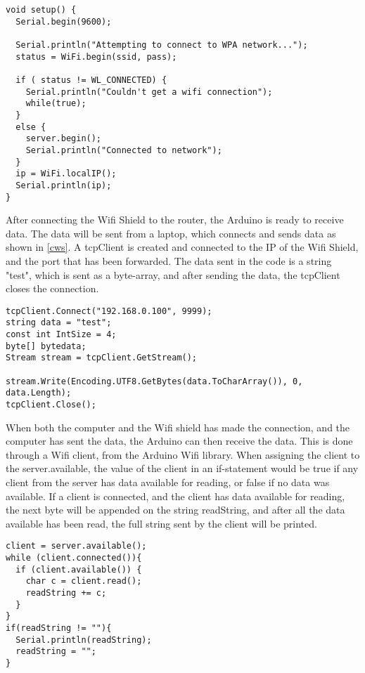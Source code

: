 \begin{lstlisting}[caption={Connecting the Wifi shield to the network}, label={ws}]
void setup() {
  Serial.begin(9600);

  Serial.println("Attempting to connect to WPA network...");
  status = WiFi.begin(ssid, pass);

  if ( status != WL_CONNECTED) { 
    Serial.println("Couldn't get a wifi connection");
    while(true);
  } 
  else {
    server.begin();
    Serial.println("Connected to network");
  }
  ip = WiFi.localIP();
  Serial.println(ip);
}
\end{lstlisting}

After connecting the Wifi Shield to the router, the Arduino is ready to receive data. The data will be sent from a laptop, which connects and sends data as shown in \ref{cws}. A tcpClient is created and connected to the IP of the Wifi Shield, and the port that has been forwarded. The data sent in the code is a string "test", which is sent as a byte-array, and after sending the data, the tcpClient closes the connection.

\begin{lstlisting}[caption={Connecting the computer to the Wifi Shield}, label={cws}]
tcpClient.Connect("192.168.0.100", 9999);
string data = "test";
const int IntSize = 4;
byte[] bytedata;
Stream stream = tcpClient.GetStream();

stream.Write(Encoding.UTF8.GetBytes(data.ToCharArray()), 0, data.Length);
tcpClient.Close();
\end{lstlisting}

When both the computer and the Wifi shield has made the connection, and the computer has sent the data, the Arduino can then receive the data. This is done through a Wifi client, from the Arduino Wifi library. When assigning the client to the server.available, the value of the client in an if-statement would be true if any client from the server has data available for reading, or false if no data was available. If a client is connected, and the client has data available for reading, the next byte will be appended on the string readString, and after all the data available has been read, the full string sent by the client will be printed.

\begin{lstlisting}[caption={Receiving data from the computer}, label={rdc}]
client = server.available();
while (client.connected()){
  if (client.available()) {
    char c = client.read(); 
    readString += c;
  }
}
if(readString != ""){
  Serial.println(readString);
  readString = "";
}
\end{lstlisting}

